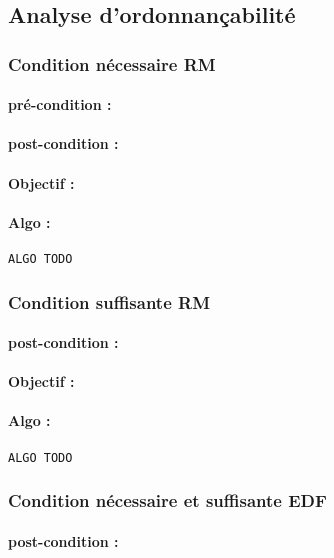 		
		\subsection{Analyse d'ordonnançabilité}
		
			\subsubsection{Condition nécessaire RM}\paragraph{pré-condition :} 
				\paragraph{post-condition :} 
				\paragraph{Objectif :} 
				\paragraph{Algo :} 
					\begin{verbatim}
ALGO TODO
					\end{verbatim}
			
			\subsubsection{Condition suffisante RM}
				\paragraph{post-condition :} 
				\paragraph{Objectif :} 
				\paragraph{Algo :} 
					\begin{verbatim}
ALGO TODO
					\end{verbatim}
			
			
			\subsubsection{Condition nécessaire et suffisante EDF}
				\paragraph{post-condition :} 
